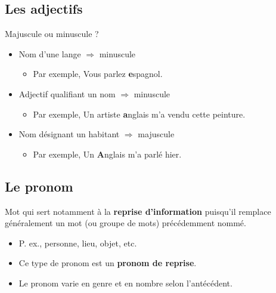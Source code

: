 \documentclass[10pt, french]{article}
\begin{document}
\begin{multicols*}{2}
\subsection{Les adjectifs}
\begin{definitionNOHFILLsub}
Majuscule ou minuscule ?
\begin{itemize}
	\item	Nom d'une lange $\Rightarrow$ minuscule
		\begin{itemize}
		\item	Par exemple, Vous parlez \textbf{e}spagnol.
		\end{itemize}
	\item	Adjectif qualifiant un nom $\Rightarrow$ minuscule
		\begin{itemize}
		\item	Par exemple, Un artiste \textbf{a}nglais m'a vendu cette peinture.
		\end{itemize}
	\item	Nom désignant un habitant $\Rightarrow$ majuscule
		\begin{itemize}
		\item	Par exemple, Un \textbf{A}nglais m'a parlé hier.
		\end{itemize}
\end{itemize}
\end{definitionNOHFILLsub}


\columnbreak
\subsection{Le pronom}
\begin{definitionNOHFILL}[Le pronom]
Mot qui sert notamment à la \textbf{reprise d'information} puisqu'il remplace généralement un mot (ou groupe de mots) précédemment nommé.

\begin{itemize}
	\item	P. ex., personne, lieu, objet, etc.
	\item	Ce  type de pronom est un \textbf{pronom de reprise}.
	\item	Le pronom varie en genre et en nombre selon l'antécédent.
\end{itemize}
\end{definitionNOHFILL}


\end{multicols*}
\end{document}
